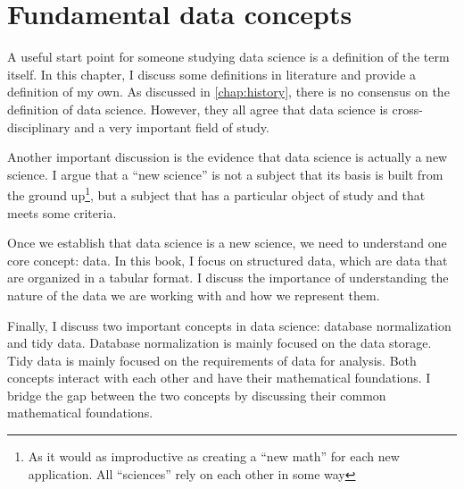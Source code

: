 \chapter{Fundamental data concepts}
\label{chap:data}


A useful start point for someone studying data science is a definition of the term itself.
In this chapter, I discuss some definitions in literature and provide a definition of my
own.  As discussed in \cref{chap:history}, there is no consensus on the definition of data
science.  However, they all agree that data science is cross-disciplinary and a very
important field of study.

Another important discussion is the evidence that data science is actually a new science.
I argue that a ``new science'' is not a subject that its basis is built from the ground
up\footnote{As it would as improductive as creating a ``new math'' for each new
application.  All ``sciences'' rely on each other in some way}, but a subject that has a
particular object of study and that meets some criteria.

Once we establish that data science is a new science, we need to understand one core
concept: data.  In this book, I focus on structured data, which are data that are organized
in a tabular format.  I discuss the importance of understanding the nature of the data we
are working with and how we represent them.

Finally, I discuss two important concepts in data science: database normalization and tidy
data.  Database normalization is mainly focused on the data storage.  Tidy data is mainly
focused on the requirements of data for analysis.  Both concepts interact with each other
and have their mathematical foundations.  I bridge the gap between the two concepts by
discussing their common mathematical foundations.

